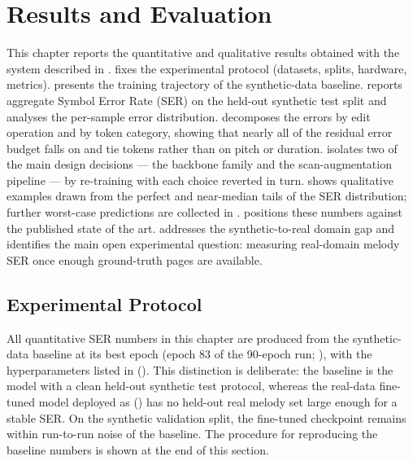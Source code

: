 \chapter{Results and Evaluation}
\label{ch:results}

This chapter reports the quantitative and qualitative results obtained
with the system described in .
 fixes the experimental protocol (datasets,
splits, hardware, metrics).
 presents the training trajectory of the
synthetic-data baseline.
 reports aggregate Symbol Error Rate (SER) on the
held-out synthetic test split and analyses the per-sample error
distribution.
 decomposes the errors by edit operation and by
token category, showing that nearly all of the residual error budget
falls on  and tie tokens rather than on pitch or duration.
 isolates two of the main design decisions ---
the backbone family and the scan-augmentation pipeline --- by
re-training with each choice reverted in turn.
 shows qualitative examples drawn from the
perfect and near-median tails of the SER distribution; further
worst-case predictions are collected in .
 positions these numbers against the published
state of the art.
 addresses the synthetic-to-real domain gap
and identifies the main open experimental question: measuring real-domain
melody SER once enough ground-truth pages are available.


\section{Experimental Protocol}
\label{sec:res-protocol}

All quantitative SER numbers in this chapter are produced from the
synthetic-data baseline at its best epoch (epoch 83 of the 90-epoch run;
), with the hyperparameters listed in
 (). This distinction is
deliberate: the baseline is the model with a clean held-out synthetic
test protocol, whereas the real-data fine-tuned model deployed as
 () has no
held-out real melody set large enough for a stable SER. On the synthetic
validation split, the fine-tuned checkpoint remains within run-to-run
noise of the baseline. The procedure for reproducing the baseline
numbers is shown at the end of this section.

